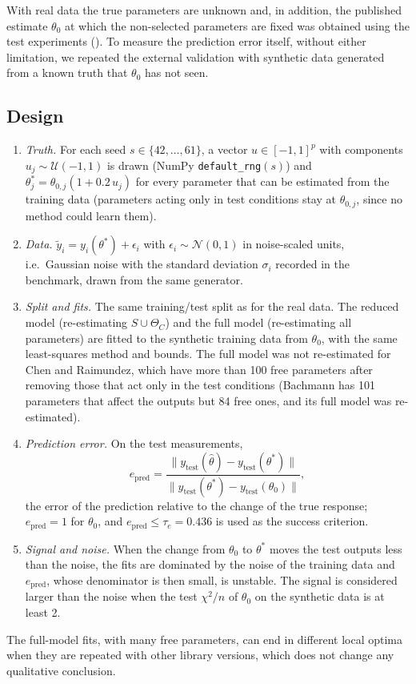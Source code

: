 
With real data the true parameters are unknown and, in addition, the published estimate $\theta_0$ at which the non-selected parameters are fixed was obtained using the test experiments (). To measure the prediction error itself, without either limitation, we repeated the external validation with synthetic data generated from a known truth that $\theta_0$ has not seen.

\subsection*{Design}
\begin{enumerate}\itemsep0pt
\item \emph{Truth.} For each seed $s\in\{42,\dots,61\}$, a vector $u\in[-1,1]^p$ with components $u_j\sim\mathcal U(-1,1)$ is drawn (NumPy \texttt{default\_rng}$(s)$) and $\theta^\ast_j=\theta_{0,j}(1+0.2\,u_j)$ for every parameter that can be estimated from the training data (parameters acting only in test conditions stay at $\theta_{0,j}$, since no method could learn them).
\item \emph{Data.} $\tilde y_i=y_i(\theta^\ast)+\epsilon_i$ with $\epsilon_i\sim\mathcal N(0,1)$ in noise-scaled units, i.e.\ Gaussian noise with the standard deviation $\sigma_i$ recorded in the benchmark, drawn from the same generator.
\item \emph{Split and fits.} The same training/test split as for the real data. The reduced model (re-estimating $S\cup\Theta_C$) and the full model (re-estimating all parameters) are fitted to the synthetic training data from $\theta_0$, with the same least-squares method and bounds. The full model was not re-estimated for Chen and Raimundez, which have more than 100 free parameters after removing those that act only in the test conditions (Bachmann has 101 parameters that affect the outputs but 84 free ones, and its full model was re-estimated).
\item \emph{Prediction error.} On the test measurements,
\[ e_{\mathrm{pred}}=\frac{\|y_{\mathrm{test}}(\hat\theta)-y_{\mathrm{test}}(\theta^\ast)\|}{\|y_{\mathrm{test}}(\theta^\ast)-y_{\mathrm{test}}(\theta_0)\|}, \]
the error of the prediction relative to the change of the true response; $e_{\mathrm{pred}}=1$ for $\theta_0$, and $e_{\mathrm{pred}}\le\tau_e=0.436$ is used as the success criterion.
\item \emph{Signal and noise.} When the change from $\theta_0$ to $\theta^\ast$ moves the test outputs less than the noise, the fits are dominated by the noise of the training data and $e_{\mathrm{pred}}$, whose denominator is then small, is unstable. The signal is considered larger than the noise when the test $\chi^2/n$ of $\theta_0$ on the synthetic data is at least 2.
\end{enumerate}
The full-model fits, with many free parameters, can end in different local optima when they are repeated with other library versions, which does not change any qualitative conclusion.

